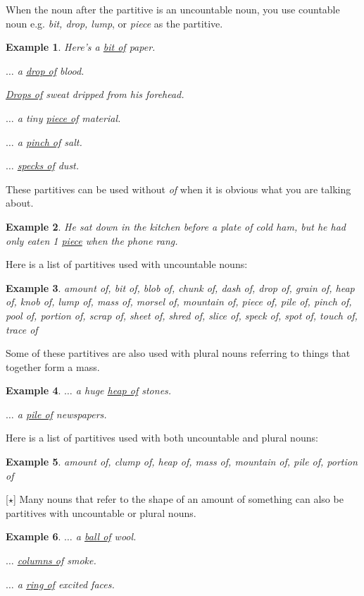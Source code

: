 \documentclass[oneside]{book}
\numberwithin{equation}{section}
\newtheorem{example}{Example}[section]
\begin{document}
%
\noindent{} When the noun after the partitive is an uncountable noun, you use countable noun e.g. \textit{bit, drop, lump}, or \textit{piece} as the partitive.
\begin{example}
    Here's a \underline{bit of} paper.
    
    $\ldots$ a \underline{drop of} blood.
    
    \underline{Drops of} sweat dripped from his forehead.
    
    $\ldots$ a tiny \underline{piece of} material.
    
    $\ldots$ a \underline{pinch of} salt.
    
    $\ldots$ \underline{specks of} dust.
\end{example}
These partitives can be used without \textit{of} when it is obvious what you are talking about.
\begin{example}
    He sat down in the kitchen before a plate of cold ham, but he had only eaten 1 \underline{piece} when the phone rang.
\end{example}
%
\noindent{} Here is a list of partitives used with uncountable nouns:
\begin{example}
    amount of, bit of, blob of, chunk of, dash of, drop of, grain of, heap of, knob of, lump of, mass of, morsel of, mountain of, piece of, pile of, pinch of, pool of, portion of, scrap of, sheet of, shred of, slice of, speck of, spot of, touch of, trace of
\end{example}
Some of these partitives are also used with plural nouns referring to things that together form a mass.
\begin{example}
    $\ldots$ a huge \underline{heap of} stones.
    
    $\ldots$ a \underline{pile of} newspapers.
\end{example}
Here is a list of partitives used with both uncountable and plural nouns:
\begin{example}
    amount of, clump of, heap of, mass of, mountain of, pile of, portion of
\end{example}
%
\noindent{} [$\star$] Many nouns that refer to the shape of an amount of something can also be partitives with uncountable or plural nouns.
\begin{example}
    $\ldots$ a \underline{ball of} wool.
    
    $\ldots$ \underline{columns of} smoke.
    
    $\ldots$ a \underline{ring of} excited faces.
\end{example}
\end{document}
